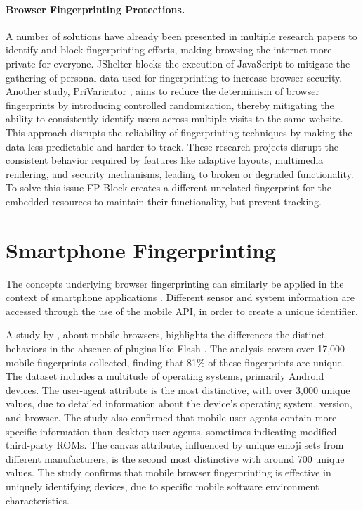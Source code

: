 \documentclass[11pt,
  oneside,openany,    %
]{scrreprt}
\begin{document}
\paragraph{Browser Fingerprinting Protections.}
\label{par:browser_fingerprint_protect}
A number of solutions have already been presented in multiple research papers to identify and block fingerprinting efforts, making browsing the internet more private for everyone. 
JShelter \cite{DBLP:conf/secrypt/PolcakSMHM23} blocks the execution of JavaScript to mitigate the gathering of personal data used for fingerprinting to increase browser security.
Another study, PriVaricator \cite{DBLP:conf/www/NikiforakisJL15}, aims to reduce the determinism of browser fingerprints by introducing controlled randomization, thereby mitigating the ability to consistently identify users across multiple visits to the same website.
This approach disrupts the reliability of fingerprinting techniques by making the data less predictable and harder to track.
These research projects disrupt the consistent behavior required by features like adaptive layouts, multimedia rendering, and security mechanisms, leading to broken or degraded functionality. 
To solve this issue FP-Block \cite{DBLP:conf/esorics/TorresJM15} creates a different unrelated fingerprint for the embedded resources to maintain their functionality, but prevent tracking.

\section{Smartphone Fingerprinting}
\label{sec:smartphone_fingerprint}
The concepts underlying browser fingerprinting can similarly be applied in the context of smartphone applications \cite{DBLP:conf/IEEEares/PalfingerP20}. 
Different sensor and system information are accessed through the use of the mobile API, in order to create a unique identifier.

A study by \citeauthor{DBLP:conf/www/Gomez-BoixLB18}, about mobile browsers, highlights the differences the distinct behaviors in the absence of plugins like Flash \cite{DBLP:conf/www/Gomez-BoixLB18}.
The analysis covers over 17,000 mobile fingerprints collected, finding that 81\% of these fingerprints are unique. 
The dataset includes a multitude of operating systems, primarily Android devices.
The user-agent attribute is the most distinctive, with over 3,000 unique values, due to detailed information about the device's operating system, version, and browser. 
The study also confirmed that mobile user-agents contain more specific information than desktop user-agents, sometimes indicating modified third-party ROMs.
The canvas attribute, influenced by unique emoji sets from different manufacturers, is the second most distinctive with around 700 unique values.
The study confirms that mobile browser fingerprinting is effective in uniquely identifying devices, due to specific mobile software environment characteristics.
\end{document}

